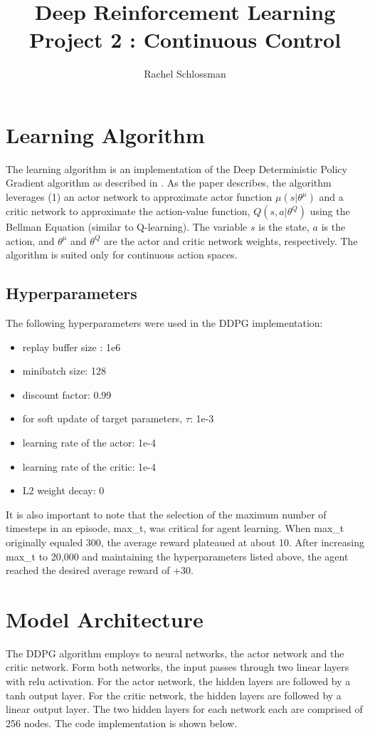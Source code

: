 \documentclass{article}
\begin{document}
\title{Deep Reinforcement Learning Project 2 : Continuous Control}
\author{Rachel Schlossman}

\maketitle

\section{Learning Algorithm}
The learning algorithm is an implementation of the Deep Deterministic Policy Gradient algorithm as described in \cite{lillicrap2015continuous}. As the paper describes, the algorithm leverages (1) an actor network to approximate actor function $\mu(s|\theta^{\mu})$ and a critic network to approximate the action-value function, $Q(s,a|\theta^Q)$ using the Bellman Equation (similar to Q-learning). The variable $s$ is the state, $a$ is the action, and $\theta^{\mu}$ and $\theta^{Q}$ are the actor and critic network weights, respectively.  The algorithm is suited only for continuous action spaces.

\subsection{Hyperparameters}
The following hyperparameters were used in the DDPG implementation:

\begin{itemize}
\item replay buffer size : 1e6
\item minibatch size: 128
\item discount factor: 0.99 
\item for soft update of target parameters, $\tau$: 1e-3
\item learning rate of the actor: 1e-4  
\item learning rate of the critic: 1e-4 
\item L2 weight decay: 0
\end{itemize}

It is also important to note that the selection of the maximum number of timesteps in an episode, max\_t, was critical for agent learning. When max\_t originally equaled 300, the average reward plateaued at about 10. After increasing max\_t to 20,000 and maintaining the hyperparameters listed above, the agent reached the desired average reward of +30.

\section{Model Architecture}
The DDPG algorithm employs to neural networks, the actor network and the critic network. Form both networks, the input passes through two linear layers with relu activation. For the actor network, the hidden layers are followed by a tanh output layer. For the critic network, the hidden layers are followed by a linear output layer. The two hidden layers for each network each are comprised of 256 nodes. The code implementation is shown below. 
\end{document}

